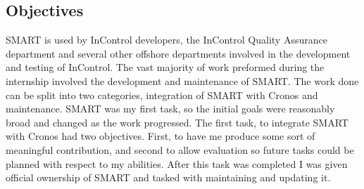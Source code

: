 \documentclass[a4paper, 11pt, titlepage]{article}
\begin{document}
\subsection{Objectives}
SMART is used by InControl developers, the InControl Quality Assurance department and several other offshore departments involved in the development and testing of InControl. The vast majority of work preformed during the internship involved the development and maintenance of SMART. The work done can be split into two categories, integration of SMART with Cronos and maintenance.
SMART was my first task, so the initial goals were reasonably broad and changed as the work progressed. The first task, to integrate SMART with Cronos had two objectives. First, to have me produce some sort of meaningful contribution, and second to allow evaluation so future tasks could be planned with respect to my abilities. After this task was completed I was given official ownership of SMART and tasked with maintaining and updating it. 
\end{document}
